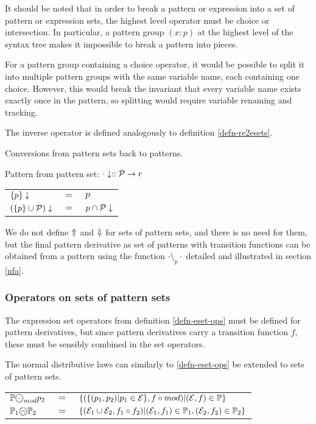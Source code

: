 It should be noted that in order to break a pattern or expression into a set of
pattern or expression sets, the highest level operator must be choice or
intersection. In particular, a pattern group $(x:p)$ at the highest level of the
syntax tree makes it impossible to break a pattern into pieces.

For a pattern group containing a choice operator, it would be possible to split
it into multiple pattern groups with the same variable name, each containing one
choice. However, this would break the invariant that every variable name exists
exactly once in the pattern, so splitting would require variable renaming and
tracking.

The inverse operator is defined analogously to definition \ref{defn-re2esets}.

\begin{defn}
   \label{defn-re2psets}
   Conversions from pattern sets back to patterns.

   Pattern from pattern set:
   $\cdot\downarrow :: \mathcal{P} \to r$

   \begin{tabular}{lll}
      $\{p\}\downarrow$			& $=$	& $p$				\\
      $(\{p\} \cup \mathcal{P})\downarrow$	& $=$	& $p \cap \mathcal{P}\downarrow$	\\
   \end{tabular}
\end{defn}

We do not define $\Uparrow$ and $\Downarrow$ for sets of pattern sets, and
there is no need for them, but the final pattern derivative as set of patterns
with transition functions can be obtained from a pattern using the function
$\cdot \setminus_p \cdot$ detailed and illustrated in section \ref{nfa}.


\subsubsection{Operators on sets of pattern sets}

The expression set operators from definition \ref{defn-eset-ops} must be defined
for pattern derivatives, but since pattern derivatives carry a transition
function $f$, these must be sensibly combined in the set operators.

\begin{defn}
   \label{defn-pset-ops}
   The normal distributive laws can similarly to \ref{defn-eset-ops} be extended
   to sets of pattern sets.

   \begin{tabular}{lll}
      $\psets \circledcdot_{mod} p_2$
         & $=$
         & $\{ (\{ (p_1, p_2) | p_1 \in \mathcal{E} \}, f \circ mod) | (\mathcal{E}, f) \in \mathbb{P} \}$
         \\

      $\mathbb{P}_1 \text{\textcircled{\tiny$\cap$}} \mathbb{P}_2$
         & $=$
         & $\{
              (\mathcal{E}_1 \cup \mathcal{E}_2, f_1 \circ f_2)
              | (\mathcal{E}_1, f_1) \in \mathbb{P}_1, (\mathcal{E}_2, f_2) \in \mathbb{P}_2
           \}$
         \\
   \end{tabular}
\end{defn}

